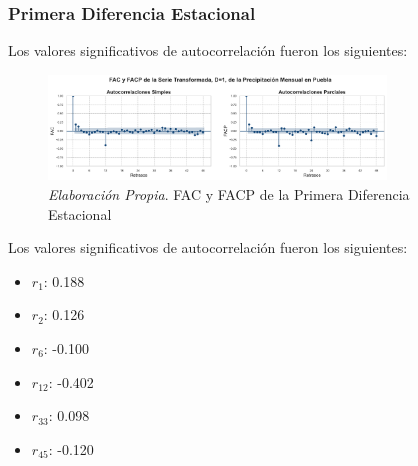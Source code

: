 \documentclass[12pt,letterpaper]{article}   %
\begin{document}
  \subsubsection{Primera Diferencia Estacional}
  Los valores significativos de autocorrelación fueron los siguientes:

\begin{figure}[ht]
    \centering
    \includegraphics[width=0.8\textwidth]{imagenes/03-10-fac-facp-serie-D1.pdf}
    \caption{\textit{Elaboración Propia}. FAC y FACP de la Primera Diferencia Estacional}
\end{figure}


Los valores significativos de autocorrelación fueron los siguientes:
\begin{multicols}{5}
\scriptsize
\begin{itemize}
    \item $r_1$: 0.188
    \item $r_2$: 0.126
    \item $r_6$: -0.100
    \item $r_{12}$: -0.402
    \item $r_{33}$: 0.098
    \item $r_{45}$: -0.120
\end{itemize}
\end{multicols}
\end{document}
